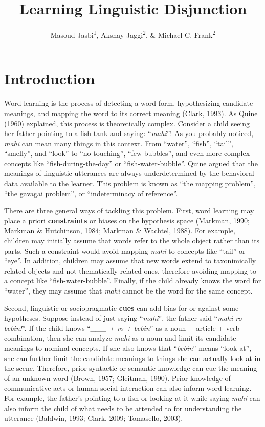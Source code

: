 \documentclass[,man,floatsintext]{apa6}
\title{Learning Linguistic Disjunction}
\author{Masoud Jasbi\textsuperscript{1}, Akshay Jaggi\textsuperscript{2}, \& Michael C. Frank\textsuperscript{2}}
\date{}
\affiliation{
\vspace{0.5cm}
\textsuperscript{1} Harvard University\\\textsuperscript{2} Stanford University}
\begin{document}
\maketitle

\hypertarget{introduction}{%
\section{Introduction}\label{introduction}}

Word learning is the process of detecting a word form, hypothesizing candidate meanings, and mapping the word to its correct meaning (Clark, 1993). As Quine (1960) explained, this process is theoretically complex. Consider a child seeing her father pointing to a fish tank and saying: \enquote{\emph{mahi}}! As you probably noticed, \emph{mahi} can mean many things in this context. From \enquote{water}, \enquote{fish}, \enquote{tail}, \enquote{smelly}, and \enquote{look} to \enquote{no touching}, \enquote{few bubbles}, and even more complex concepts like \enquote{fish-during-the-day} or \enquote{fish-water-bubble}. Quine argued that the meanings of linguistic utterances are always underdetermined by the behavioral data available to the learner. This problem is known as \enquote{the mapping problem}, \enquote{the gavagai problem}, or \enquote{indeterminacy of reference}.

There are three general ways of tackling this problem. First, word learning may place a priori \textbf{constraints} or biases on the hypothesis space (Markman, 1990; Markman \& Hutchinson, 1984; Markman \& Wachtel, 1988). For example, children may initially assume that words refer to the whole object rather than its parts. Such a constraint would avoid mapping \emph{mahi} to concepts like \enquote{tail} or \enquote{eye}. In addition, children may assume that new words extend to taxonimically related objects and not thematically related ones, therefore avoiding mapping to a concept like \enquote{fish-water-bubble}. Finally, if the child already knows the word for \enquote{water}, they may assume that \emph{mahi} cannot be the word for the same concept.

Second, linguistic or sociopragmatic \textbf{cues} can add bias for or against some hypotheses. Suppose instead of just saying \enquote{\emph{mahi}}, the father said \enquote{\emph{mahi ro bebin!}}. If the child knows \enquote{\emph{\_\_\_ + ro + bebin}} as a noun + article + verb combination, then she can analyze \emph{mahi} as a noun and limit its candidate meanings to nominal concepts. If she also knows that \enquote{\emph{bebin}} means \enquote{look at}, she can further limit the candidate meanings to things she can actually look at in the scene. Therefore, prior syntactic or semantic knowledge can cue the meaning of an unknown word (Brown, 1957; Gleitman, 1990). Prior knowledge of communicative acts or human social interaction can also inform word learning. For example, the father's pointing to a fish or looking at it while saying \emph{mahi} can also inform the child of what needs to be attended to for understanding the utterance (Baldwin, 1993; Clark, 2009; Tomasello, 2003).
\end{document}
